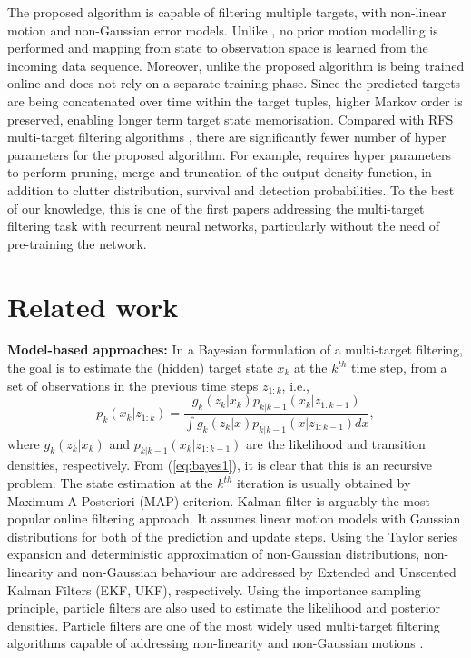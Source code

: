 \documentclass[runningheads]{llncs}
\begin{document}
The proposed algorithm is capable of filtering multiple targets, with non-linear motion and non-Gaussian error models. Unlike \cite{Reuter:2014,Vo:2014}, no prior motion modelling is performed and mapping from state to observation space is learned from the incoming data sequence. {Moreover,} unlike \cite{Milan:2017} the proposed algorithm is being trained online and does not rely on a separate training {phase}.
Since the predicted targets are being concatenated over time within the target tuples, higher Markov order is preserved, enabling longer term target state memorisation. Compared with RFS multi-target filtering algorithms \cite{Reuter:2014,Vo:2014}, there are significantly fewer number of hyper parameters for the proposed algorithm. For example, \cite{Vo:2006} requires hyper parameters to perform pruning, merge and truncation of the output density function, in addition to clutter distribution, survival and detection probabilities. To the best of our knowledge, this is one of the first papers addressing the multi-target filtering task with recurrent neural networks, particularly without the need of pre-training the network.

\section{Related work}
\label{sec:relwork}

\noindent \textbf{{Model-based approaches:}}
In a Bayesian formulation of a multi-target filtering, the goal is to estimate the (hidden) target state $x_{k}$ at the $k^{th}$ time step, from a set of observations in the previous time steps $z_{1:k}$, {i.e.},
\begin{equation}
p_k(x_k|z_{1:k}) = \frac{g_k(z_k|x_k)p_{k|k-1}(x_k|z_{1:k-1})}{\int g_k(z_k|x)p_{k|k-1}(x|z_{1:k-1})dx},
\label{eq:bayes1}
\end{equation} 
\noindent where $g_k(z_k|x_k)$ and $p_{k|k-1}(x_k|z_{1:k-1})$ are the likelihood and transition densities, respectively. From (\ref{eq:bayes1}), it is clear that this is an recursive problem. The state estimation at the $k^{th}$ iteration is usually obtained by Maximum A Posteriori (MAP) criterion.
Kalman filter is arguably the most popular online filtering approach. It assumes linear motion models with Gaussian distributions for both of the prediction and update steps. Using the Taylor series expansion and deterministic approximation of non-Gaussian distributions, non-linearity and non-Gaussian behaviour are addressed by Extended and Unscented Kalman Filters {(EKF, UKF)}, respectively. Using the importance sampling principle, particle filters are also used to estimate the likelihood and posterior densities. Particle filters are one of the most widely used multi-target filtering algorithms capable of addressing non-linearity and non-Gaussian motions \cite{Vo:2003,Vo:2005}.
\end{document}
